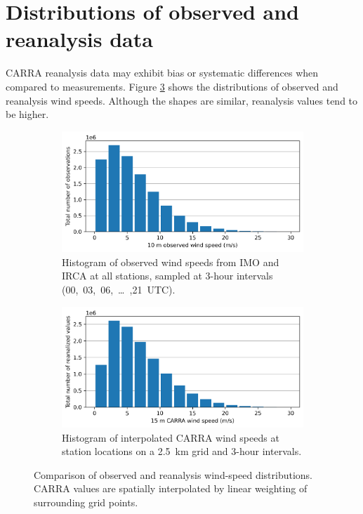 \section{Distributions of observed and reanalysis data}

CARRA reanalysis data may exhibit bias or systematic differences when compared to measurements. Figure \ref{fig:obs_carra_wind_speeds} shows the distributions of observed and reanalysis wind speeds. Although the shapes are similar, reanalysis values tend to be higher.

\begin{figure}[ht]
  \centering
  \begin{subfigure}[b]{0.8\textwidth}
    \centering
    \includegraphics[width=\textwidth]{Figures/obs_wind_speeds.png}
    \caption{Histogram of observed wind speeds from IMO and IRCA at all stations, sampled at 3-hour intervals (00,~03,~06,~…~,21~UTC).}
    \label{fig:obs_wind_speeds}
  \end{subfigure}
  
  \vspace{0.5cm}
  
  \begin{subfigure}[b]{0.8\textwidth}
    \centering
    \includegraphics[width=\textwidth]{Figures/carra_wind_speeds.png}
    \caption{Histogram of interpolated CARRA wind speeds at station locations on a 2.5~km grid and 3-hour intervals.}
    \label{fig:carra_wind_speeds}
  \end{subfigure}
  
  \caption[Comparison of observed and reanalysis wind-speed distributions.]{Comparison of observed and reanalysis wind-speed distributions. CARRA values are spatially interpolated by linear weighting of surrounding grid points.}
  \label{fig:obs_carra_wind_speeds}
\end{figure}

